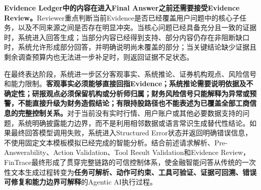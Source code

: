 \textbf{Evidence Ledger中的内容在进入Final Answer之前还需要接受Evidence Review。}Reviewer重点判断当前Evidence是否已经覆盖用户问题中的核心子任务，以及不同来源之间是否存在明显冲突。当核心问题已经具备充分且一致的证据时，系统进入回答生成；当部分内容已经得到支持、部分内容仍存在非阻断缺口时，系统允许形成部分回答，并明确说明尚未覆盖的部分；当关键结论缺少证据且剩余调查预算内也无法进一步补足时，则返回证据不足状态。

在最终表达阶段，系统进一步区分客观事实、系统推论、证券机构观点、风险信号和能力限制。\textbf{客观事实必须能够直接回指Evidence；系统推论需要说明依据及不确定性；研报观点必须保留机构或分析师归属；财务风险信号只能解释为异常或预警，不能直接升级为财务造假结论；有限持股路径也不能表述为已覆盖全部工商信息的完整控制关系。}对于当前没有实时行情、用户账户或其他必要数据支持的问题，系统明确披露能力边界，而不是利用相邻数据或语言常识生成替代性结论。如果最终回答模型调用失败，系统进入Structured Error状态并返回明确错误信息，不使用固定文本模板模拟已经完成的智能分析。结合前述请求解析、Pre-Answerability、Action Validation、Tool Result Validation和Evidence Review，FinTrace最终形成了贯穿完整链路的可信控制体系，使金融智能问答从传统的一次性文本生成过程转变为\textbf{任务可解析、动作可约束、工具可验证、证据可回溯、错误可修复和能力边界可解释}的Agentic AI执行过程。


